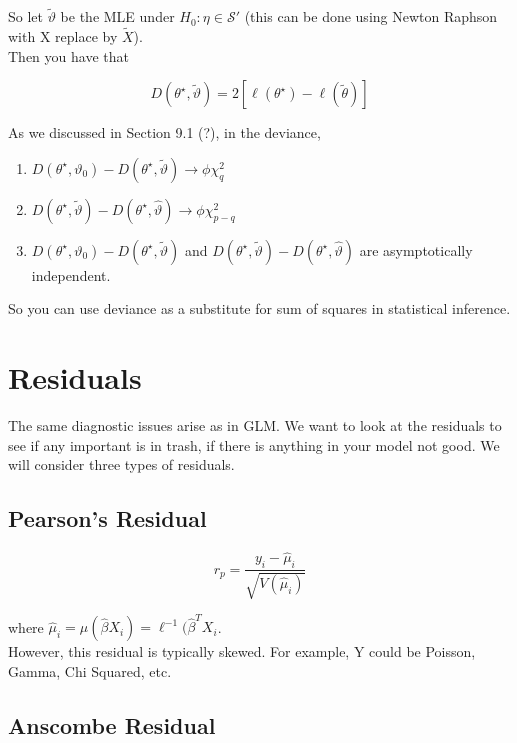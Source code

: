 \documentclass[11pt,fleqn]{book} %
\begin{document}
So let $\tilde{\vartheta}$ be the MLE under $H_0: \eta \in \mathcal{S}'$ (this can be done using Newton Raphson with X replace by $\tilde{X}$). \\

Then you have that 

		$$D(\theta^\star, \tilde{\vartheta}) = 2[\ell(\theta^\star) - \ell(\tilde{\theta})]$$

As we discussed in Section 9.1 (?), in the deviance, 

		\begin{enumerate}
			\item  $D(\theta^\star, {\vartheta_0}) - D(\theta^\star, \tilde{\vartheta}) \rightarrow \phi \chi^2_q$
			\item $D(\theta^\star, \tilde{\vartheta}) - D(\theta^\star, \hat{\vartheta}) \rightarrow \phi \chi^2_{p-q}$
			\item $D(\theta^\star, {\vartheta_0}) - D(\theta^\star, \tilde{\vartheta})$ and $D(\theta^\star, \tilde{\vartheta}) - D(\theta^\star, \hat{\vartheta})$ are asymptotically independent. 
		\end{enumerate}


So you can use deviance as a substitute for sum of squares in statistical inference. 


\section{Residuals}

The same diagnostic issues arise as in GLM. We want to look at the residuals to see if any important is in trash, if there is anything in your model not good. We will consider three types of residuals. 

\subsection{Pearson's Residual}

		$$r_p = \frac{y_i - \hat{\mu}_i}{\sqrt{V(\hat{\mu}_i)}} $$

where $\hat{\mu}_i = \mu(\hat{\beta} X_i) =\ell^{-1}(\hat{\beta}^T X_i$.\\

However, this residual is typically skewed. For example, Y could be Poisson, Gamma, Chi Squared, etc. 


\subsection{Anscombe Residual}
\end{document}
